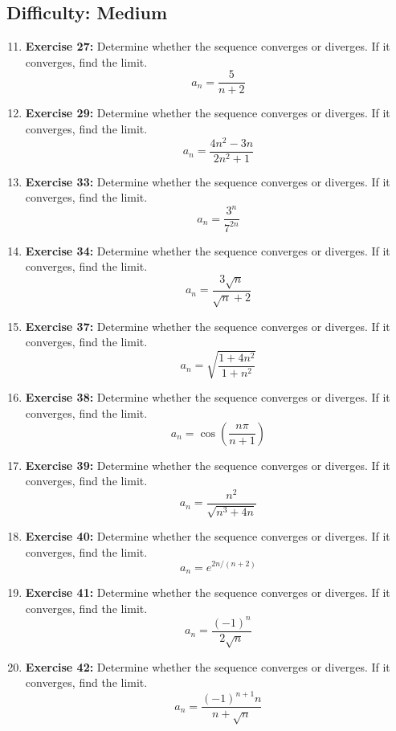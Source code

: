 \documentclass[12pt, a4paper]{article}
\begin{document}
\hrulefill
\vspace{1em}

\subsection*{Difficulty: Medium}
\begin{enumerate}
    \setcounter{enumi}{10}
    \item \textbf{Exercise 27:} Determine whether the sequence converges or diverges. If it converges, find the limit.
    \[ a_n = \frac{5}{n+2} \]

    \item \textbf{Exercise 29:} Determine whether the sequence converges or diverges. If it converges, find the limit.
    \[ a_n = \frac{4n^2 - 3n}{2n^2 + 1} \]
    
    \item \textbf{Exercise 33:} Determine whether the sequence converges or diverges. If it converges, find the limit.
    \[ a_n = \frac{3^n}{7^{2n}} \]
    
    \item \textbf{Exercise 34:} Determine whether the sequence converges or diverges. If it converges, find the limit.
    \[ a_n = \frac{3\sqrt{n}}{\sqrt{n} + 2} \]

    \item \textbf{Exercise 37:} Determine whether the sequence converges or diverges. If it converges, find the limit.
    \[ a_n = \sqrt{\frac{1 + 4n^2}{1 + n^2}} \]

    \item \textbf{Exercise 38:} Determine whether the sequence converges or diverges. If it converges, find the limit.
    \[ a_n = \cos\left(\frac{n\pi}{n+1}\right) \]
    
    \item \textbf{Exercise 39:} Determine whether the sequence converges or diverges. If it converges, find the limit.
    \[ a_n = \frac{n^2}{\sqrt{n^3 + 4n}} \]
    
    \item \textbf{Exercise 40:} Determine whether the sequence converges or diverges. If it converges, find the limit.
    \[ a_n = e^{2n/(n+2)} \]
    
    \item \textbf{Exercise 41:} Determine whether the sequence converges or diverges. If it converges, find the limit.
    \[ a_n = \frac{(-1)^n}{2\sqrt{n}} \]
    
    \item \textbf{Exercise 42:} Determine whether the sequence converges or diverges. If it converges, find the limit.
    \[ a_n = \frac{(-1)^{n+1}n}{n + \sqrt{n}} \]
    

\end{enumerate}
\end{document}
